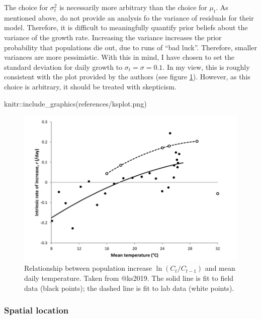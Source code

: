 \documentclass[
  oneside]{book}
\newenvironment{Shaded}{\begin{snugshade}}{\end{snugshade}}
\newcommand{\FunctionTok}[1]{\textcolor[rgb]{0.00,0.00,0.00}{#1}}
\newcommand{\NormalTok}[1]{#1}
\newcommand{\SpecialCharTok}[1]{\textcolor[rgb]{0.00,0.00,0.00}{#1}}
\newcommand{\StringTok}[1]{\textcolor[rgb]{0.31,0.60,0.02}{#1}}
\begin{document}
The choice for \(\sigma^2_t\) is necessarily more arbitrary than the choice for \(\mu_t\). As mentioned above, \citet{ks2019} do not provide an analysis fo the variance of residuals for their model. Therefore, it is difficult to meaningfully quantify prior beliefs about the variance of the growth rate. Increasing the variance increases the prior probability that populations die out, due to runs of ``bad luck''. Therefore, smaller variances are more pessimistic. With this in mind, I have chosen to set the standard deviation for daily growth to \(\sigma_t = \sigma = 0.1\). In my view, this is roughly consistent with the plot provided by the authors (see figure \ref{fig:ksplot}). However, as this choice is arbitrary, it should be treated with skepticism.

\begin{Shaded}
\begin{Highlighting}[]
\NormalTok{knitr}\SpecialCharTok{::}\FunctionTok{include\_graphics}\NormalTok{(}\StringTok{\textquotesingle{}references/ksplot.png\textquotesingle{}}\NormalTok{)}
\end{Highlighting}
\end{Shaded}

\begin{figure}

{\centering \includegraphics[width=0.75\linewidth]{references/ksplot} 

}

\caption{Relationship between population increase $\ln (C_t / C_{t-1})$ and mean daily temperature. Taken from @ks2019. The solid line is fit to field data (black points); the dashed line is fit to lab data (white points).}\label{fig:ksplot}
\end{figure}

\hypertarget{spatial-location}{%
\subsubsection{Spatial location}\label{spatial-location}}
\end{document}
